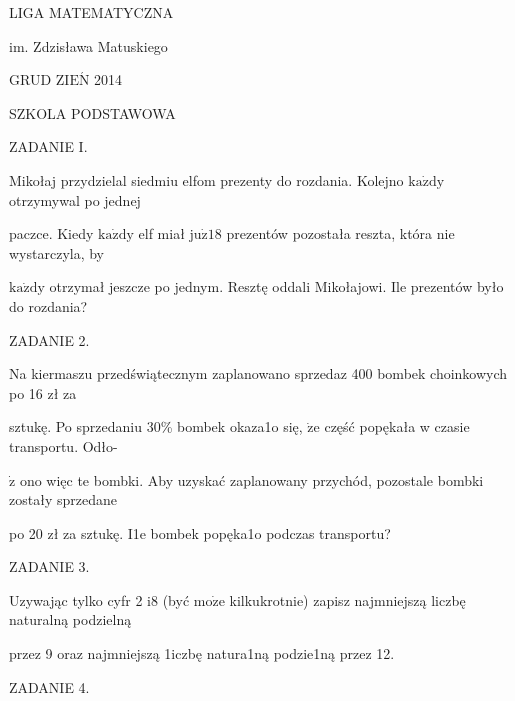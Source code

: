\documentclass[a4paper,12pt]{article}
\begin{document}
LIGA MATEMATYCZNA

im. Zdzisława Matuskiego

GRUD Z$\mathrm{I}\mathrm{E}\acute{\mathrm{N}}$ 2014

SZKOLA PODSTAWOWA

ZADANIE I.

Mikołaj przydzielal siedmiu elfom prezenty do rozdania. Kolejno $\mathrm{k}\mathrm{a}\dot{\mathrm{z}}\mathrm{d}\mathrm{y}$ otrzymywal po jednej

paczce. Kiedy $\mathrm{k}\mathrm{a}\dot{\mathrm{z}}\mathrm{d}\mathrm{y}$ elf miał $\mathrm{j}\mathrm{u}\dot{\mathrm{z}} 18$ prezentów pozostała reszta, która nie wystarczyla, by

$\mathrm{k}\mathrm{a}\dot{\mathrm{z}}\mathrm{d}\mathrm{y}$ otrzymał jeszcze po jednym. Resztę oddali Mikołajowi. Ile prezentów było do rozdania?

ZADANIE 2.

Na kiermaszu przedświątecznym zaplanowano sprzedaz 400 bombek choinkowych po 16 zł za

sztukę. Po sprzedaniu 30\% bombek okaza1o się, $\dot{\mathrm{z}}\mathrm{e}$ część popękała w czasie transportu. Odło-

$\dot{\mathrm{z}}$ ono więc te bombki. Aby uzyskać zaplanowany przychód, pozostale bombki zostały sprzedane

po 20 zł za sztukę. I1e bombek popęka1o podczas transportu?

ZADANIE 3.

Uzywając tylko cyfr 2 $\mathrm{i}8$ (być $\mathrm{m}\mathrm{o}\dot{\mathrm{z}}\mathrm{e}$ kilkukrotnie) zapisz najmniejszą liczbę naturalną podzielną

przez 9 oraz najmniejszą 1iczbę natura1ną podzie1ną przez 12.

ZADANIE 4.
\end{document}

